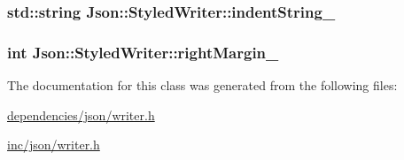 \hypertarget{classJson_1_1StyledWriter_a98a33f1d4c853a4dbf87ca17499c5830}{
\subsubsection[{indent\-String\-\_\-}]{\setlength{\rightskip}{0pt plus 5cm}std\-::string Json\-::\-Styled\-Writer\-::indent\-String\-\_\-\hspace{0.3cm}{\ttfamily [private]}}}\label{d8/d76/classJson_1_1StyledWriter_a98a33f1d4c853a4dbf87ca17499c5830}
\hypertarget{classJson_1_1StyledWriter_a9c8fc62cb4f3b4a6dbed470fea2aa567}{
\subsubsection[{right\-Margin\-\_\-}]{\setlength{\rightskip}{0pt plus 5cm}int Json\-::\-Styled\-Writer\-::right\-Margin\-\_\-\hspace{0.3cm}{\ttfamily [private]}}}\label{d8/d76/classJson_1_1StyledWriter_a9c8fc62cb4f3b4a6dbed470fea2aa567}


The documentation for this class was generated from the following files\-:\begin{DoxyCompactItemize}
\item 
\hyperlink{dependencies_2json_2writer_8h}{dependencies/json/writer.\-h}\item 
\hyperlink{inc_2json_2writer_8h}{inc/json/writer.\-h}\end{DoxyCompactItemize}
